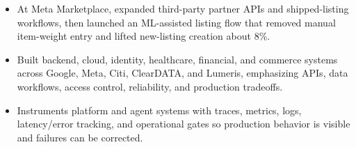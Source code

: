 \begin{itemize}
  \item At Meta Marketplace, expanded third-party partner APIs and shipped-listing workflows, then launched an ML-assisted listing flow that removed manual item-weight entry and lifted new-listing creation about 8\%.
  \item Built backend, cloud, identity, healthcare, financial, and commerce systems across Google, Meta, Citi, ClearDATA, and Lumeris, emphasizing APIs, data workflows, access control, reliability, and production tradeoffs.
  \item Instruments platform and agent systems with traces, metrics, logs, latency/error tracking, and operational gates so production behavior is visible and failures can be corrected.
\end{itemize}




